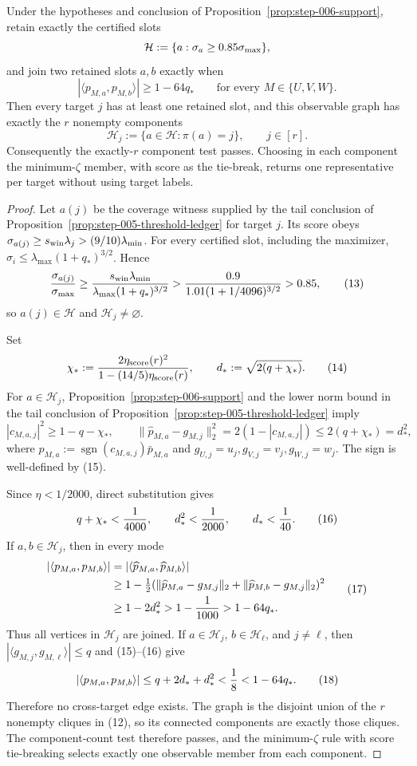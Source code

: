 \begin{proposition}\label{prop:step-006-graph}
Under the hypotheses and conclusion of
Proposition~\ref{prop:step-006-support}, retain exactly the certified slots
\[
{\cal H}:=\{a:\sigma_a\ge0.85\sigma_{\max}\},
\]
and join two retained slots $a,b$ exactly when
\[
|\langle p_{M,a},p_{M,b}\rangle|\ge1-64q_*
\qquad\text{for every }M\in\{U,V,W\}.
\]
Then every target $j$ has at least one retained slot, and this observable
graph has exactly the $r$ nonempty components
\[
 \mathcal H_j:=\{a\in\mathcal H:\pi(a)=j\},\qquad j\in[r]. \tag{12}
\]
Consequently the exactly-$r$ component test passes. Choosing in each component
the minimum-$\zeta$ member, with score as the tie-break, returns one
representative per target without using target labels.

\begin{proof}
Let \(a(j)\) be the coverage witness supplied by the tail conclusion of Proposition~\ref{prop:step-005-threshold-ledger} for
target \(j\). Its score obeys
\(\sigma_{a(j)}\ge s_{\rm win}\lambda_j>(9/10)\lambda_{\min}\).
For every certified slot, including the maximizer,
\(\sigma_i\le\lambda_{\max}(1+q_*)^{3/2}\). Hence
\[
 {\sigma_{a(j)}\over\sigma_{\max}}
 \ge {s_{\rm win}\lambda_{\min}\over
 \lambda_{\max}(1+q_*)^{3/2}}
 >{0.9\over1.01(1+1/4096)^{3/2}}>0.85, \tag{13}
\]
so \(a(j)\in\mathcal H\) and \(\mathcal H_j\ne\varnothing\).

Set
\[
 \chi_*:={2\eta_{\rm score}(r)^2\over
 1-(14/5)\eta_{\rm score}(r)},\qquad
 d_*:=\sqrt{2(q+\chi_*)}. \tag{14}
\]
For \(a\in\mathcal H_j\), Proposition~\ref{prop:step-006-support} and
the lower norm bound in the tail conclusion of Proposition~\ref{prop:step-005-threshold-ledger} imply
\[
 |c_{M,a,j}|^2\ge1-q-\chi_*,\qquad
 \|\widehat p_{M,a}-g_{M,j}\|_2^2
 =2(1-|c_{M,a,j}|)\le2(q+\chi_*)=d_*^2, \tag{15}
\]
where \(\widehat p_{M,a}:=\operatorname{sgn}(c_{M,a,j})\bar p_{M,a}\) and
\(g_{U,j}=u_j,g_{V,j}=v_j,g_{W,j}=w_j\). The sign is well-defined by
(15).

Since \(\eta<1/2000\), direct substitution gives
\[
 q+\chi_*<{1\over4000},\qquad d_*^2<{1\over2000},\qquad d_*<{1\over40}. \tag{16}
\]
If \(a,b\in\mathcal H_j\), then in every mode
\[
 \begin{aligned}
 |\langle p_{M,a},p_{M,b}\rangle|
 &=|\langle\widehat p_{M,a},\widehat p_{M,b}\rangle|\\
 &\ge1-\tfrac12(\|\widehat p_{M,a}-g_{M,j}\|_2
             +\|\widehat p_{M,b}-g_{M,j}\|_2)^2\\
 &\ge1-2d_*^2>1-{1\over1000}>1-64q_*.
 \end{aligned} \tag{17}
\]
Thus all vertices in \(\mathcal H_j\) are joined. If \(a\in\mathcal H_j\),
\(b\in\mathcal H_\ell\), and \(j\ne\ell\), then
\(|\langle g_{M,j},g_{M,\ell}\rangle|\le q\) and (15)--(16) give
\[
 |\langle p_{M,a},p_{M,b}\rangle|
 \le q+2d_*+d_*^2<{1\over8}<1-64q_*.
 \tag{18}
\]
Therefore no cross-target edge exists. The graph is the disjoint union of
the \(r\) nonempty cliques in (12), so its connected components are exactly
those cliques. The component-count test therefore passes, and the
minimum-$\zeta$ rule with score tie-breaking selects exactly one observable
member from each component.



\end{proof}
\end{proposition}
